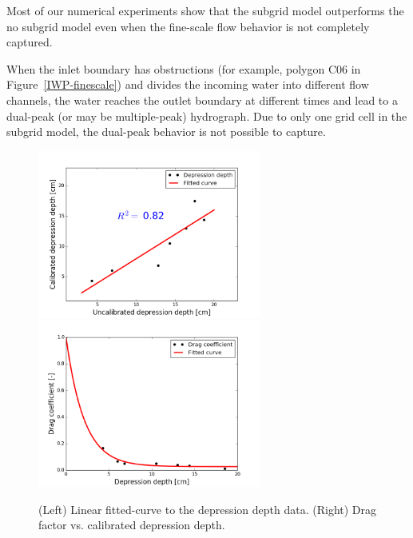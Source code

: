 \documentclass[review,11pt]{elsarticle}
\begin{document}
{{\item Most of our numerical experiments show that the subgrid model outperforms the no subgrid model even when the fine-scale flow behavior is not completely captured.

\item When the inlet boundary has obstructions (for example, polygon C06 in Figure~\ref{IWP-finescale}) and divides the incoming water into different flow channels, the water reaches the outlet boundary at different times and lead to a dual-peak (or may be multiple-peak) hydrograph.  Due to only one grid cell in the subgrid model, the dual-peak behavior is not possible to capture.

}
\begin{figure}[!h]
\centering
\includegraphics[width=6.cm, height=5.5cm]{./figures/fittedcurve-dd-1.png}
\includegraphics[width=6.cm, height=5.5cm]{./figures/fittedcurve-manning.png}
\caption{ (Left) Linear fitted-curve to the depression depth data. (Right) Drag factor vs. calibrated depression depth.}
\label{curvefit-dd-manning}
\end{figure}

}
\end{document}

